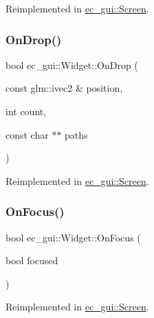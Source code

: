 Reimplemented in \mbox{\hyperlink{classec__gui_1_1_screen_ad80e3b3a1ea500da673e62675185ff18}{ec\+\_\+gui\+::\+Screen}}.

\mbox{\label{classec__gui_1_1_widget_a2b053e3f775081317f2bae8600efcdea}} 
\subsubsection{\texorpdfstring{On\+Drop()}{OnDrop()}}
{\footnotesize\ttfamily bool ec\+\_\+gui\+::\+Widget\+::\+On\+Drop (\begin{DoxyParamCaption}\item[{const glm\+::ivec2 \&}]{position,  }\item[{int}]{count,  }\item[{const char $\ast$$\ast$}]{paths }\end{DoxyParamCaption})\hspace{0.3cm}{\ttfamily [virtual]}}



Reimplemented in \mbox{\hyperlink{classec__gui_1_1_screen_adb7eb3a5c83749054a6b275cd05ddee7}{ec\+\_\+gui\+::\+Screen}}.

\mbox{\label{classec__gui_1_1_widget_ad8c4e0841214f66501a0cefc4f6e863e}} 
\subsubsection{\texorpdfstring{On\+Focus()}{OnFocus()}}
{\footnotesize\ttfamily bool ec\+\_\+gui\+::\+Widget\+::\+On\+Focus (\begin{DoxyParamCaption}\item[{bool}]{focused }\end{DoxyParamCaption})\hspace{0.3cm}{\ttfamily [virtual]}}



Reimplemented in \mbox{\hyperlink{classec__gui_1_1_screen_a3a0f971501303d0285c0f38c2b424237}{ec\+\_\+gui\+::\+Screen}}.

\mbox{\label{classec__gui_1_1_widget_adcbf1cb953e1cb480635befc379c8e62}} 
